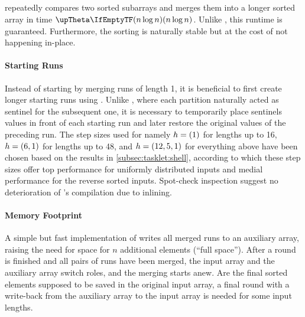 \subsection{\texorpdfstring{\MS{}}{MergeSort}}
\label{subsec:tasklet:merge}

\MS{} repeatedly compares two sorted subarrays and merges them into a longer sorted array in time \(\bigtheta{n \log n}\).
Unlike \QS{}, this runtime is guaranteed.
Furthermore, the sorting is naturally stable but at the cost of not happening in-place.

\paragraph{Starting Runs}
Instead of starting by merging runs of length 1, it is beneficial to first create longer starting runs using \ShS{}.
Unlike \QS{}, where each partition naturally acted as sentinel for the subsequent one, it is necessary to temporarily place sentinels values in front of each starting run and later restore the original values of the preceding run.
The step sizes used for \ShS{} \Dash namely \(h = (1)\) for lengths up to 16, \(h = (6, 1)\) for lengths up to 48, and \(h = (12, 5, 1)\) for everything above \Dash have been chosen based on the results in \cref{subsec:tasklet:shell}, according to which these step sizes offer top performance for uniformly distributed inputs and medial performance for the reverse sorted inputs.
Spot-check inspection suggest no deterioration of \ShS{}'s compilation due to inlining.

\paragraph{Memory Footprint}
A simple but fast implementation of \MS{} writes all merged runs to an auxiliary array, raising the need for space for \(n\) additional elements (\enquote{full space}).
After a round is finished and all pairs of runs have been merged, the input array and the auxiliary array switch roles, and the merging starts anew.
Are the final sorted elements supposed to be saved in the original input array, a final round with a write-back from the auxiliary array to the input array is needed for some input lengths.


